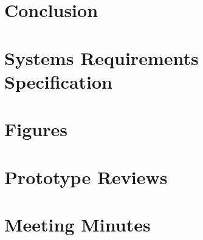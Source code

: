 \documentclass[12pt]{report}
\newcommand\blankpage{%
    \null
    \thispagestyle{empty}%
    \addtocounter{page}{-1}%
    \newpage}
\begin{document}
\chapter{Conclusion}



\afterpage{\blankpage}

\begin{appendices}

\chapter{Systems Requirements Specification}



\chapter{Figures}



\chapter{Prototype Reviews} \label{Prototype Reviews}



\afterpage{\blankpage}
\chapter{Meeting Minutes}


\end{appendices}

% 
% 
\printbibliography
\end{document}
